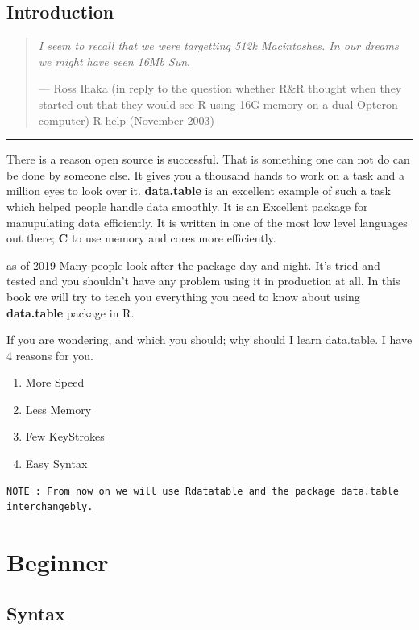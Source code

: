 \documentclass[
]{book}
\providecommand{\tightlist}{%
  \setlength{\itemsep}{0pt}\setlength{\parskip}{0pt}}
\begin{document}
\hypertarget{intro}{%
\chapter{Introduction}\label{intro}}

\begin{quote}
\emph{I seem to recall that we were targetting 512k Macintoshes. In our dreams we might have seen 16Mb Sun}.

--- Ross Ihaka
(in reply to the question whether R\&R thought when they started
out that they would see R using 16G memory on a dual Opteron computer)
R-help (November 2003)
\end{quote}

\begin{center}\rule{0.5\linewidth}{0.5pt}\end{center}

There is a reason open source is successful. That is something one can not do can be done by someone else. It gives you a thousand hands to work on a task and a million eyes to look over it. \textbf{data.table} is an excellent example of such a task which helped people handle data smoothly. It is an Excellent package for manupulating data efficiently. It is written in one of the most low level languages out there; \textbf{C} to use memory and cores more efficiently.

as of 2019 Many people look after the package day and night. It's tried and tested and you shouldn't have any problem using it in production at all. In this book we will try to teach you everything you need to know about using \textbf{data.table} package in R.

If you are wondering, and which you should; why should I learn data.table. I have 4 reasons for you.

\begin{enumerate}
\def\labelenumi{\arabic{enumi}.}
\tightlist
\item
  More Speed
\item
  Less Memory
\item
  Few KeyStrokes
\item
  Easy Syntax
\end{enumerate}

\begin{verbatim}
NOTE : From now on we will use Rdatatable and the package data.table interchangebly.
\end{verbatim}

\hypertarget{part-beginner}{%
\part{Beginner}\label{part-beginner}}

\hypertarget{syntax}{%
\chapter{Syntax}\label{syntax}}

  
\end{document}
